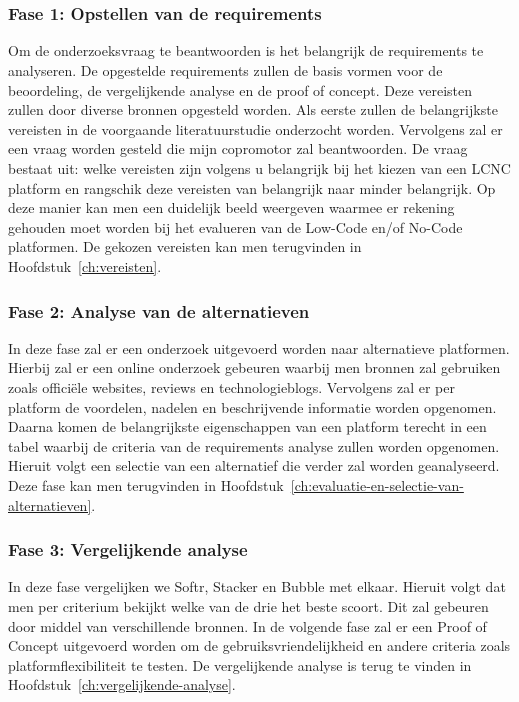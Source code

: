 
\chapter{}%
\label{ch:methodologie}

\subsection*{Fase 1: Opstellen van de requirements}%
\label{sec:opstellen-van-de-requirements}
Om de onderzoeksvraag te beantwoorden is het belangrijk 
de requirements te analyseren. De opgestelde requirements zullen de basis vormen voor de beoordeling, de vergelijkende analyse en de proof of concept.
Deze vereisten zullen door diverse bronnen opgesteld worden. Als eerste
zullen de belangrijkste vereisten in de voorgaande literatuurstudie onderzocht worden. Vervolgens zal er een vraag
worden gesteld die mijn copromotor zal beantwoorden. De vraag bestaat uit: welke vereisten zijn volgens u belangrijk bij het kiezen van een 
LCNC platform en rangschik deze vereisten van belangrijk naar minder belangrijk. Op deze manier kan men een duidelijk beeld weergeven waarmee er rekening gehouden moet worden 
bij het evalueren van de Low-Code en/of No-Code platformen. De gekozen vereisten kan men terugvinden in Hoofdstuk~\ref{ch:vereisten}.

\subsection*{Fase 2: Analyse van de alternatieven}%
\label{sec:analyse-van-de-alternatieven}
In deze fase zal er een onderzoek uitgevoerd worden naar alternatieve platformen.
Hierbij zal er een online onderzoek gebeuren waarbij men bronnen zal gebruiken zoals 
officiële websites, reviews en technologieblogs. Vervolgens zal er per platform de 
voordelen, nadelen en beschrijvende informatie worden opgenomen. Daarna komen 
de belangrijkste eigenschappen van een platform terecht in een tabel waarbij de criteria
van de requirements analyse zullen worden opgenomen. Hieruit volgt een selectie van een 
alternatief die verder zal worden geanalyseerd. Deze fase kan men terugvinden in Hoofdstuk~\ref{ch:evaluatie-en-selectie-van-alternatieven}.


\subsection*{Fase 3: Vergelijkende analyse}%
\label{sec:vergelijkende-analyse}
In deze fase vergelijken we Softr, Stacker en Bubble met elkaar.
Hieruit volgt dat men per criterium bekijkt welke van de drie het beste scoort. Dit zal gebeuren door middel van verschillende bronnen.
In de volgende fase zal er een Proof of Concept uitgevoerd worden om de gebruiksvriendelijkheid en andere criteria zoals platformflexibiliteit te testen.
De vergelijkende analyse is terug te vinden in Hoofdstuk~\ref{ch:vergelijkende-analyse}.

